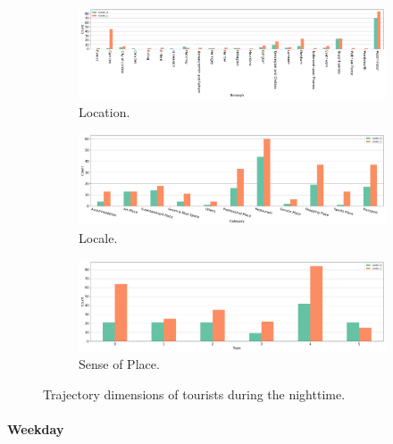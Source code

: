 \documentclass{article}
\newcommand{\subsubsubsection}[1]{\paragraph{#1}\mbox{}\\}
\theoremstyle{definition}
\theoremstyle{remark}
\begin{document}
\begin{figure}[!h]

\centering
\begin{subfigure}{0.6\textheight}
\centering
\includegraphics[width=1\linewidth]{figures/traj_location_nighttime_tourists.png}
\caption{Location.}
\label{fig:traj_location_nighttime_tourists}
\end{subfigure}
\begin{subfigure}{0.6\textheight}
\centering
\includegraphics[width=1\linewidth]{figures/traj_locale_nighttime_tourists.png}
\caption{Locale.}
\label{fig:traj_locale_nighttime_tourists}
\end{subfigure}
\begin{subfigure}{0.6\textheight}
\centering
\includegraphics[width=1\linewidth]{figures/traj_sense_nighttime_tourists.png}
\caption{Sense of Place.}
\label{fig:traj_sense_nighttime_tourists}
\end{subfigure}

\caption{Trajectory dimensions of tourists during the nighttime.}
\label{fig:traj_dimension_nighttime_tourists}
\end{figure}


\subsubsubsection{Weekday}
\end{document}

